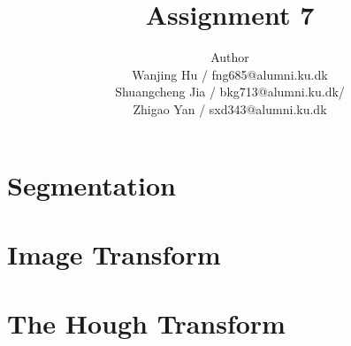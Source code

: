 \documentclass[12pt]{article}
\title{Assignment 7}
\author{Author \\
 Wanjing Hu / fng685@alumni.ku.dk  \\
 Shuangcheng Jia / bkg713@alumni.ku.dk/   \\
 Zhigao Yan / sxd343@alumni.ku.dk  \\
}
\begin{document}
\maketitle

\section{Segmentation}

\section{Image Transform}

\section{The Hough Transform}
\end{document}
